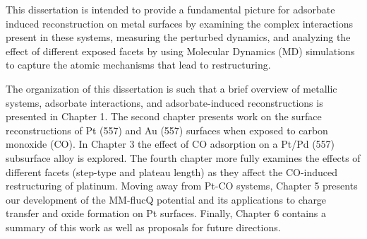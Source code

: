 This dissertation is intended to provide a fundamental picture for adsorbate
induced reconstruction on metal surfaces by examining the complex interactions
present in these systems, measuring the perturbed dynamics, and analyzing the
effect of different exposed facets by using Molecular Dynamics (MD) simulations
to capture the atomic mechanisms that lead to restructuring.



The organization of this dissertation is such that a brief overview of metallic
systems, adsorbate interactions, and adsorbate-induced reconstructions is
presented in Chapter 1.  The second chapter presents work on the surface
reconstructions of Pt (557) and Au (557) surfaces when exposed to carbon
monoxide (CO). In Chapter 3 the effect of CO adsorption on a Pt/Pd (557)
subsurface alloy is explored. The fourth chapter more fully examines the
effects of different facets (step-type and plateau length) as they affect the
CO-induced restructuring of platinum. Moving away from Pt-CO systems, Chapter 5
presents our development of the MM-flucQ potential and its applications to
charge transfer and oxide formation on Pt surfaces. Finally, Chapter 6 contains
a summary of this work as well as proposals for future directions.

